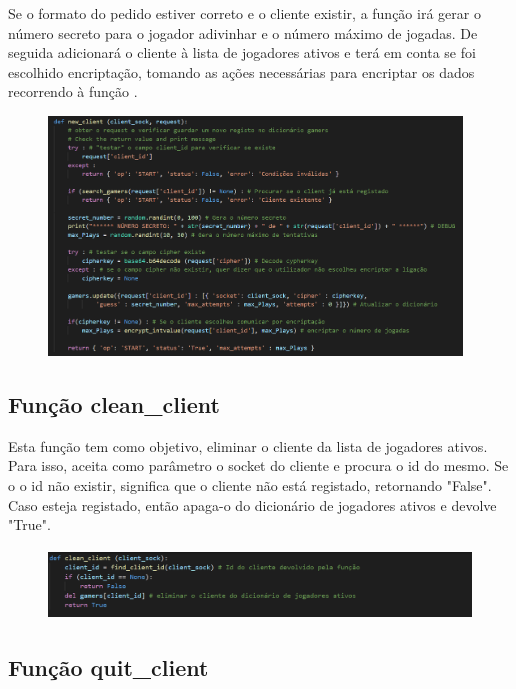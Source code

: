 \documentclass{report}
\begin{document}
Se o formato do pedido estiver correto e o cliente existir, a função irá gerar o número secreto para o jogador adivinhar e o número máximo de jogadas. De seguida adicionará o cliente à lista de jogadores ativos e terá em conta se foi escolhido encriptação, tomando as ações necessárias para encriptar os dados recorrendo à função  .

\begin{figure}[!h]
\center
\includegraphics[height = 180pt]{img/newclient.png}
\end{figure}

\subsection{Função clean\_client}
\label{ssec:func_clean_client}

Esta função tem como objetivo, eliminar o cliente da lista de jogadores ativos. Para isso, aceita como parâmetro o socket do cliente e procura o id do mesmo. Se o o id não existir, significa que o cliente não está registado, retornando "False". Caso esteja registado, então apaga-o do dicionário de jogadores ativos e devolve "True".

\begin{figure}[!h]
\center
\includegraphics[height = 53pt]{img/cleanclient.png}
\end{figure}

\subsection{Função quit\_client}
\label{ssec:func_quit_client}
\end{document}
